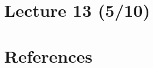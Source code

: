 \section{Lecture 13 (5/10)}

\newpage
%
%
%
%
%
%
%
%
%
%
%
%
%
%

\section*{References}
\vspace{0.1in}

